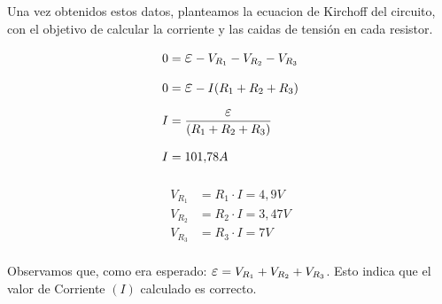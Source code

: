\documentclass[12pt]{report}
\newcommand {\LEpsilon}{\mathlarger{\mathlarger{\varepsilon}}}
\begin{document}
Una vez obtenidos estos datos, planteamos la ecuacion de Kirchoff del circuito,
con el objetivo de calcular la corriente y las caidas de tensión en cada resistor.

\begin{minipage}[t]{0.48\textwidth}
  $$
  \begin{aligned}
    0 &= \LEpsilon - V_{R_1} - V_{R_2} - V_{R_3}\\[6pt]
    0 &= \LEpsilon - I (R_1 + R_2 + R_3)\\[6pt]
    I &= \frac{\LEpsilon}{(R_1 + R_2 + R_3)}\\[6pt]
    I &= 101,\!78A\\[6pt]
  \end{aligned}
  $$
\end{minipage}
\hfill
\begin{minipage}[t]{0.48\textwidth}
  \vspace{7mm}
  $$
  \begin{aligned}
    V_{R_1} &= R_1 \cdot I = 4,\!9 V\\[6pt]
    V_{R_2} &= R_2 \cdot I = 3,\!47 V\\[6pt]
    V_{R_3} &= R_3 \cdot I = 7 V\\[6pt]
  \end{aligned}
  $$
\end{minipage}

Observamos que, como era esperado: $\LEpsilon =  V_{R_1} + V_{R_2} + V_{R_3}$. Esto 
indica que el valor de Corriente $(I)$ calculado es correcto.

%
%
%
%
\end{document}
